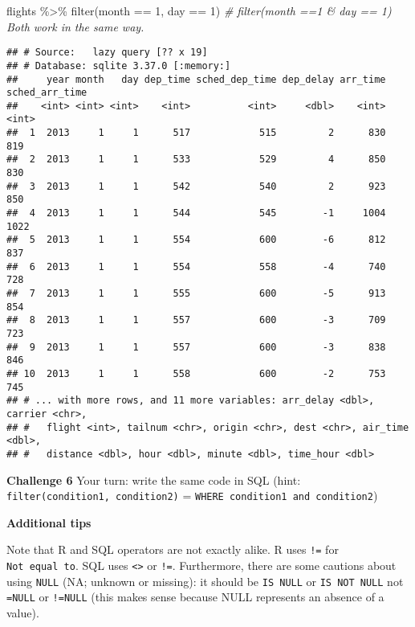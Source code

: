 \documentclass[
]{book}
\newenvironment{Shaded}{\begin{snugshade}}{\end{snugshade}}
\newcommand{\CommentTok}[1]{\textcolor[rgb]{0.56,0.35,0.01}{\textit{#1}}}
\newcommand{\DecValTok}[1]{\textcolor[rgb]{0.00,0.00,0.81}{#1}}
\newcommand{\FunctionTok}[1]{\textcolor[rgb]{0.00,0.00,0.00}{#1}}
\newcommand{\NormalTok}[1]{#1}
\newcommand{\SpecialCharTok}[1]{\textcolor[rgb]{0.00,0.00,0.00}{#1}}
\begin{document}
\begin{Shaded}
\begin{Highlighting}[]
\NormalTok{flights }\SpecialCharTok{\%\textgreater{}\%} 
  \FunctionTok{filter}\NormalTok{(month }\SpecialCharTok{==} \DecValTok{1}\NormalTok{, day }\SpecialCharTok{==} \DecValTok{1}\NormalTok{) }\CommentTok{\# filter(month ==1 \& day == 1) Both work in the same way.}
\end{Highlighting}
\end{Shaded}

\begin{verbatim}
## # Source:   lazy query [?? x 19]
## # Database: sqlite 3.37.0 [:memory:]
##     year month   day dep_time sched_dep_time dep_delay arr_time sched_arr_time
##    <int> <int> <int>    <int>          <int>     <dbl>    <int>          <int>
##  1  2013     1     1      517            515         2      830            819
##  2  2013     1     1      533            529         4      850            830
##  3  2013     1     1      542            540         2      923            850
##  4  2013     1     1      544            545        -1     1004           1022
##  5  2013     1     1      554            600        -6      812            837
##  6  2013     1     1      554            558        -4      740            728
##  7  2013     1     1      555            600        -5      913            854
##  8  2013     1     1      557            600        -3      709            723
##  9  2013     1     1      557            600        -3      838            846
## 10  2013     1     1      558            600        -2      753            745
## # ... with more rows, and 11 more variables: arr_delay <dbl>, carrier <chr>,
## #   flight <int>, tailnum <chr>, origin <chr>, dest <chr>, air_time <dbl>,
## #   distance <dbl>, hour <dbl>, minute <dbl>, time_hour <dbl>
\end{verbatim}

\textbf{Challenge 6}
Your turn: write the same code in SQL (hint: \texttt{filter(condition1,\ condition2)} = \texttt{WHERE\ condition1\ and\ condition2})

\textbf{Additional tips}

Note that R and SQL operators are not exactly alike. R uses \texttt{!=} for \texttt{Not\ equal\ to}. SQL uses \texttt{\textless{}\textgreater{}} or \texttt{!=}. Furthermore, there are some cautions about using \texttt{NULL} (NA; unknown or missing): it should be \texttt{IS\ NULL} or \texttt{IS\ NOT\ NULL} not \texttt{=NULL} or \texttt{!=NULL} (this makes sense because NULL represents an absence of a value).
\end{document}
